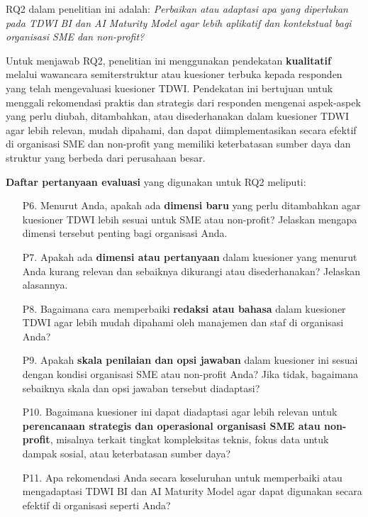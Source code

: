 \documentclass{article}
\begin{document}
RQ2 dalam penelitian ini adalah: \textit{Perbaikan atau adaptasi apa yang diperlukan pada TDWI BI dan AI Maturity Model agar lebih aplikatif dan kontekstual bagi organisasi SME dan non-profit?}

Untuk menjawab RQ2, penelitian ini menggunakan pendekatan \textbf{kualitatif} melalui wawancara semiterstruktur atau kuesioner terbuka kepada responden yang telah mengevaluasi kuesioner TDWI. Pendekatan ini bertujuan untuk menggali rekomendasi praktis dan strategis dari responden mengenai aspek-aspek yang perlu diubah, ditambahkan, atau disederhanakan dalam kuesioner TDWI agar lebih relevan, mudah dipahami, dan dapat diimplementasikan secara efektif di organisasi SME dan non-profit yang memiliki keterbatasan sumber daya dan struktur yang berbeda dari perusahaan besar.

\textbf{Daftar pertanyaan evaluasi} yang digunakan untuk RQ2 meliputi:

\begin{enumerate}
	\item[P6.] Menurut Anda, apakah ada \textbf{dimensi baru} yang perlu ditambahkan agar kuesioner TDWI lebih sesuai untuk SME atau non-profit?  
	Jelaskan mengapa dimensi tersebut penting bagi organisasi Anda.
	
	\item[P7.] Apakah ada \textbf{dimensi atau pertanyaan} dalam kuesioner yang menurut Anda kurang relevan dan sebaiknya dikurangi atau disederhanakan?  
	Jelaskan alasannya.
	
	\item[P8.] Bagaimana cara memperbaiki \textbf{redaksi atau bahasa} dalam kuesioner TDWI agar lebih mudah dipahami oleh manajemen dan staf di organisasi Anda?
	
	\item[P9.] Apakah \textbf{skala penilaian dan opsi jawaban} dalam kuesioner ini sesuai dengan kondisi organisasi SME atau non-profit Anda?  
	Jika tidak, bagaimana sebaiknya skala dan opsi jawaban tersebut diadaptasi?
	
	\item[P10.] Bagaimana kuesioner ini dapat diadaptasi agar lebih relevan untuk \textbf{perencanaan strategis dan operasional organisasi SME atau non-profit}, misalnya terkait tingkat kompleksitas teknis, fokus data untuk dampak sosial, atau keterbatasan sumber daya?
	
	\item[P11.] Apa rekomendasi Anda secara keseluruhan untuk memperbaiki atau mengadaptasi TDWI BI dan AI Maturity Model agar dapat digunakan secara efektif di organisasi seperti Anda?
\end{enumerate}
\end{document}
